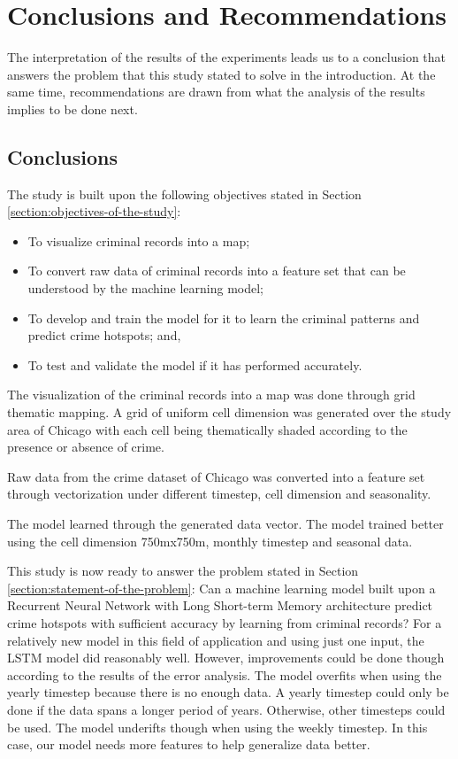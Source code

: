 \chapter{Conclusions and Recommendations}
    The interpretation of the results of the experiments leads us to a conclusion that answers the problem that this study stated to solve in the introduction. At the same time, recommendations are drawn from what the analysis of the results implies to be done next.

\section{Conclusions}
    The study is built upon the following objectives stated in Section \ref{section:objectives-of-the-study}:
    \begin{itemize}
        \item To visualize criminal records into a map;
        \item To convert raw data of criminal records into a feature set that can be understood by the machine learning model;
        \item To develop and train the model for it to learn the criminal patterns and predict crime hotspots; and,
        \item To test and validate the model if it has performed accurately.
    \end{itemize}

    The visualization of the criminal records into a map was done through grid thematic mapping. A grid of uniform cell dimension was generated over the study area of Chicago with each cell being thematically shaded according to the presence or absence of crime.

    Raw data from the crime dataset of Chicago was converted into a feature set through vectorization under different timestep, cell dimension and seasonality.

    The model learned through the generated data vector. The model trained better using the cell dimension 750mx750m, monthly timestep and seasonal data.

    This study is now ready to answer the problem stated in Section \ref{section:statement-of-the-problem}: Can a machine learning model built upon a Recurrent Neural Network with Long Short-term Memory architecture predict crime hotspots with sufficient accuracy by learning from criminal records? For a relatively new model in this field of application and using just one input, the LSTM model did reasonably well. However, improvements could be done though according to the results of the error analysis. The model overfits when using the yearly timestep because there is no enough data. A yearly timestep could only be done if the data spans a longer period of years. Otherwise, other timesteps could be used. The model underifts though when using the weekly timestep. In this case, our model needs more features to help generalize data better.

